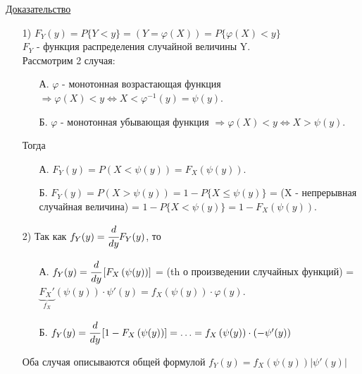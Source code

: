 \underline{Доказательство} 
\begin{enumerate}
\item[1)] $F_Y(y) = P\{Y < y\} = \left(Y = \varphi(X)\right) = P\{\varphi(X) < y\}$ \\
$F_Y$ - функция распределения случайной величины Y. \\
Рассмотрим 2 случая:
	\begin{enumerate}
	\item[А.] $\varphi$ - монотонная возрастающая функция $\Rightarrow \varphi(X) < y \Leftrightarrow X < \varphi^{-1}(y) = \psi(y)$.
	\item[Б.] $\varphi$ - монотонная убывающая функция $\Rightarrow \varphi(X) < y \Leftrightarrow X > \psi(y)$.
	\end{enumerate}
Тогда
	\begin{enumerate}
	\item[А.] $F_Y(y) = P\left(X < \psi(y)\right) = F_X \left(\psi(y)\right)$.
	\item[Б.] $F_Y(y) = P\left(X > \psi(y)\right) = 1 - P\{X \leqslant \psi(y)\}$ = (X - непрерывная случайная величина) = $1 - P\{X < \psi(y)\} = 1 - F_X\left(\psi(y)\right)$.
	\end{enumerate}

\item[2)] Так как $f_Y(y) = \cfrac{d}{dy} F_Y(y)$, то 
	\begin{enumerate}
	\item[А.] $f_Y(y) = \cfrac{d}{dy} \left[F_X \left(\psi(y)\right) \right]$ = (th о произведении случайных функций) = $\underbrace{F_X'}_{f_X} \left(\psi(y)\right) \cdot \psi'(y) = f_X \left(\psi(y)\right) \cdot \varphi(y)$.
	\item[Б.] $f_Y(y) = \cfrac{d}{dy} \left[ 1 - F_X \left(\psi(y)\right) \right] = \ldots = f_X \left(\psi(y)\right) \cdot \left(- \psi'(y) \right)$
	\end{enumerate}
Оба случая описываются общей формулой
$f_Y(y) = f_X \left(\psi(y)\right) \left|\psi'(y)\right|$
\end{enumerate}


